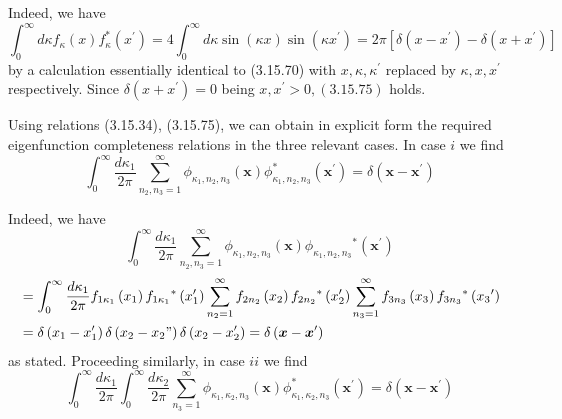 \documentclass{article}
\begin{document}
Indeed, we have
$$
\begin{equation*}
\int_{0}^{\infty} d \kappa f_{\kappa}(x) f_{\kappa}^{*}\left(x^{\prime}\right)=4 \int_{0}^{\infty} d \kappa \sin (\kappa x) \sin \left(\kappa x^{\prime}\right)=2 \pi\left[\delta\left(x-x^{\prime}\right)-\delta\left(x+x^{\prime}\right)\right] \tag{3.15.76}
\end{equation*}
$$
by a calculation essentially identical to (3.15.70) with $x, \kappa, \kappa^{\prime}$ replaced by $\kappa, x, x^{\prime}$ respectively. Since $\delta\left(x+x^{\prime}\right)=0$ being $x, x^{\prime}>0,(3.15 .75)$ holds.

Using relations (3.15.34), (3.15.75), we can obtain in explicit form the required eigenfunction completeness relations in the three relevant cases. In case $i$ we find
$$
\begin{equation*}
\int_{0}^{\infty} \frac{d \kappa_{1}}{2 \pi} \sum_{n_{2}, n_{3}=1}^{\infty} \phi_{\kappa_{1}, n_{2}, n_{3}}(\boldsymbol{x}) \phi_{\kappa_{1}, n_{2}, n_{3}}^{*}\left(\boldsymbol{x}^{\prime}\right)=\delta\left(\boldsymbol{x}-\boldsymbol{x}^{\prime}\right) \tag{3.15.77}
\end{equation*}
$$

Indeed, we have
$$
\begin{equation*}
\int_{0}^{\infty} \frac{d \kappa_{1}}{2 \pi} \sum_{n_{2}, n_{3}=1}^{\infty} \phi_{\kappa_{1}, n_{2}, n_{3}}(\boldsymbol{x}) \phi_{\kappa_{1}, n_{2}, n_{3}}{ }^{*}\left(\boldsymbol{x}^{\prime}\right) \tag{3.15.78}
\end{equation*}
$$
$$
\begin{aligned}
& =\int_{0}^{\infty} \frac{d \kappa_{1}}{2 \pi} f_{1 \kappa_{1}}\left(x_{1}\right) f_{1 \kappa_{1}}{ }^{*}\left(x_{1}^{\prime}\right) \sum_{n_{2}=1}^{\infty} f_{2 n_{2}}\left(x_{2}\right) f_{2 n_{2}}{ }^{*}\left(x_{2}^{\prime}\right) \sum_{n_{3}=1}^{\infty} f_{3 n_{3}}\left(x_{3}\right) f_{3 n_{3}}{ }^{*}\left(x_{3}{ }^{\prime}\right) \\
& =\delta\left(x_{1}-x_{1}^{\prime}\right) \delta\left(x_{2}-x_{2} "\right) \delta\left(x_{2}-x_{2}^{\prime}\right)=\delta\left(\boldsymbol{x}-\boldsymbol{x}^{\prime}\right)
\end{aligned}
$$
as stated. Proceeding similarly, in case $i i$ we find
$$
\begin{equation*}
\int_{0}^{\infty} \frac{d \kappa_{1}}{2 \pi} \int_{0}^{\infty} \frac{d \kappa_{2}}{2 \pi} \sum_{n_{3}=1}^{\infty} \phi_{\kappa_{1}, \kappa_{2}, n_{3}}(\boldsymbol{x}) \phi_{\kappa_{1}, \kappa_{2}, n_{3}}^{*}\left(\boldsymbol{x}^{\prime}\right)=\delta\left(\boldsymbol{x}-\boldsymbol{x}^{\prime}\right) \tag{3.15.79}
\end{equation*}
$$
\end{document}
